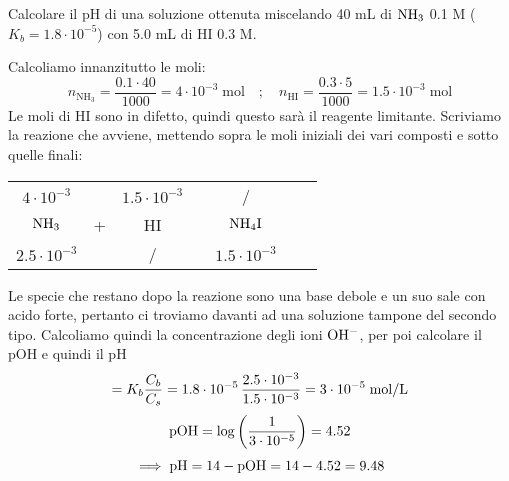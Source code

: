 \begin{esercizio}
    Calcolare il pH di una soluzione ottenuta miscelando 40 mL di $\rm NH_3$ 0.1 M ($K_b = 1.8 \cdot 10^{-5}$) con 5.0 mL di HI 0.3 M.
\end{esercizio}
\begin{soluzione}
    Calcoliamo innanzitutto le moli:
    \begin{equation*}
        n_{\text{NH}_3}=\frac{0.1 \cdot 40}{1000}
        =4 \cdot 10^{-3} \; \text{mol}
        \quad ; \quad
        n_{\text{HI}}=\frac{0.3 \cdot 5}{1000}
        =1.5 \cdot 10^{-3} \;\text{mol}
    \end{equation*}
    Le moli di HI sono in difetto, quindi questo sarà il reagente limitante. Scriviamo la reazione che avviene, mettendo sopra le moli iniziali dei vari composti e sotto quelle finali:
    \begin{center}
        \begin{tabular}{ccccccc}
            $4 \cdot 10^{-3}$ & & $1.5 \cdot 10^{-3}$ & & /\\
            $\rm NH_3$ & + & HI & \ce{->} & $\rm NH_4I$ \\
            $2.5 \cdot 10^{-3}$ & & / & & $1.5 \cdot 10^{-3}$\\
        \end{tabular}
    \end{center}
    Le specie che restano dopo la reazione sono una base debole e un suo sale con acido forte, pertanto ci troviamo davanti ad una soluzione tampone del secondo tipo. Calcoliamo quindi la concentrazione degli ioni $\rm OH^-$, per poi calcolare il pOH e quindi il pH
    \begin{gather*}
        [\text{OH}^-]=K_b\frac{C_b}{C_s}
        =1.8 \cdot 10^{-5}\,\frac{2.5 \cdot 10^{-3}}{1.5 \cdot 10^{-3}}
        = 3 \cdot 10^{-5} \; \rm mol/L
        \\[0.1cm]
        \rm pOH=\log\left(\frac{1}{3 \cdot 10^{-5}}\right)=4.52
        \\[0.1cm]
        \implies \rm pH=14-pOH=14-4.52=9.48
    \end{gather*}
\end{soluzione}

\newpage

